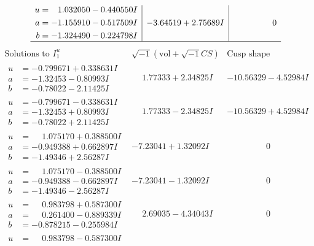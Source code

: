 \documentclass[1p]{elsarticle_modified}
\theoremstyle{definition}
\newcommand{\I}{\sqrt{-1}}
\begin{document}
$$\begin{array}{c|c|c}
\begin{aligned}
u &= \phantom{-}1.032050 - 0.440550 I \\
a &= -1.155910 - 0.517509 I \\
b &= -1.324490 - 0.224798 I\end{aligned}
 & -3.64519 + 2.75689 I & \phantom{-0.000000 } 0\\
 \hline 
 \end{array}$$\newpage$$\begin{array}{c|c|c}  
\text{Solutions to }I^u_{1}& \I (\text{vol} + \sqrt{-1}CS) & \text{Cusp shape}\\
 \hline 
\begin{aligned}
u &= -0.799671 + 0.338631 I \\
a &= -1.32453 - 0.80993 I \\
b &= -0.78022 - 2.11425 I\end{aligned}
 & \phantom{-}1.77333 + 2.34825 I & -10.56329 - 4.52984 I \\ \hline\begin{aligned}
u &= -0.799671 - 0.338631 I \\
a &= -1.32453 + 0.80993 I \\
b &= -0.78022 + 2.11425 I\end{aligned}
 & \phantom{-}1.77333 - 2.34825 I & -10.56329 + 4.52984 I \\ \hline\begin{aligned}
u &= \phantom{-}1.075170 + 0.388500 I \\
a &= -0.949388 + 0.662897 I \\
b &= -1.49346 + 2.56287 I\end{aligned}
 & -7.23041 + 1.32092 I & \phantom{-0.000000 } 0 \\ \hline\begin{aligned}
u &= \phantom{-}1.075170 - 0.388500 I \\
a &= -0.949388 - 0.662897 I \\
b &= -1.49346 - 2.56287 I\end{aligned}
 & -7.23041 - 1.32092 I & \phantom{-0.000000 } 0 \\ \hline\begin{aligned}
u &= \phantom{-}0.983798 + 0.587300 I \\
a &= \phantom{-}0.261400 - 0.889339 I \\
b &= -0.878215 - 0.255984 I\end{aligned}
 & \phantom{-}2.69035 - 4.34043 I & \phantom{-0.000000 } 0 \\ \hline\begin{aligned}
u &= \phantom{-}0.983798 - 0.587300 I \\

\end{aligned}
\end{array}$$
\end{document}
